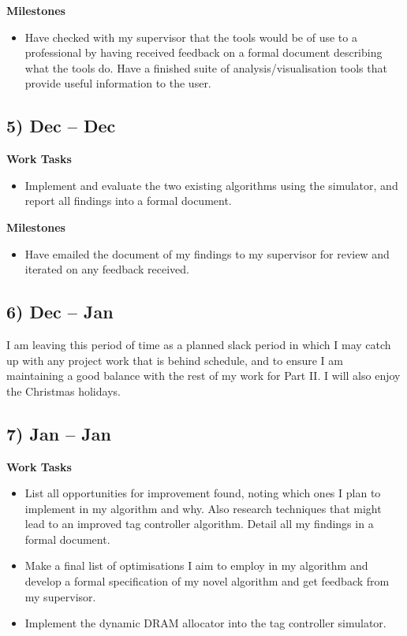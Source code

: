 \documentclass[10pt,a4paper]{article}
\begin{document}
\textbf{Milestones}
\begin{itemize}
	\item Have checked with my supervisor that the tools would be of use to a professional by having received feedback on a formal document describing what the tools do. Have a finished suite of analysis/visualisation tools that provide useful information to the user.
\end{itemize}

\subsection*{5)  Dec --  Dec}
\textbf{Work Tasks}
\begin{itemize}
	\item Implement and evaluate the two existing algorithms using the simulator, and report all findings into a formal document.
\end{itemize}

\textbf{Milestones}
\begin{itemize}
	\item Have emailed the document of my findings to my supervisor for review and iterated on any feedback received.
\end{itemize}

\subsection*{6)  Dec --  Jan}
I am leaving this period of time as a planned slack period in which I may catch up with any project work that is behind schedule, and to ensure I am maintaining a good balance with the rest of my work for Part II. I will also enjoy the Christmas holidays.

\subsection*{7)  Jan --  Jan}
\textbf{Work Tasks}
\begin{itemize}
	\item List all opportunities for improvement found, noting which ones I plan to implement in my algorithm and why. Also research techniques that might lead to an improved tag controller algorithm. Detail all my findings in a formal document.
	\item Make a final list of optimisations I aim to employ in my algorithm and develop a formal specification of my novel algorithm and get feedback from my supervisor.
	\item Implement the dynamic DRAM allocator into the tag controller simulator.
\end{itemize}
\end{document}
